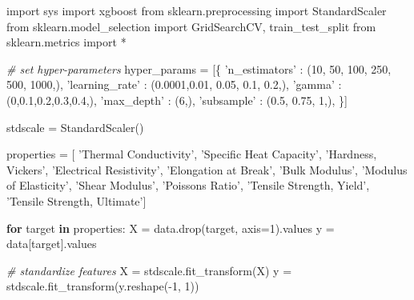 \documentclass[11pt]{article}
\newenvironment{Shaded}{}{}
\newcommand{\KeywordTok}[1]{\textcolor[rgb]{0.00,0.44,0.13}{\textbf{{#1}}}}
\newcommand{\DecValTok}[1]{\textcolor[rgb]{0.25,0.63,0.44}{{#1}}}
\newcommand{\FloatTok}[1]{\textcolor[rgb]{0.25,0.63,0.44}{{#1}}}
\newcommand{\StringTok}[1]{\textcolor[rgb]{0.25,0.44,0.63}{{#1}}}
\newcommand{\CommentTok}[1]{\textcolor[rgb]{0.38,0.63,0.69}{\textit{{#1}}}}
\newcommand{\NormalTok}[1]{{#1}}
\newcommand{\ImportTok}[1]{{#1}}
\newcommand{\ControlFlowTok}[1]{\textcolor[rgb]{0.00,0.44,0.13}{\textbf{{#1}}}}
\newcommand{\OperatorTok}[1]{\textcolor[rgb]{0.40,0.40,0.40}{{#1}}}
\begin{document}
    \begin{Shaded}
\begin{Highlighting}[]
\ImportTok{import}\NormalTok{ sys}
\ImportTok{import}\NormalTok{ xgboost}
\ImportTok{from}\NormalTok{ sklearn.preprocessing }\ImportTok{import}\NormalTok{ StandardScaler}
\ImportTok{from}\NormalTok{ sklearn.model_selection }\ImportTok{import}\NormalTok{ GridSearchCV, train_test_split}
\ImportTok{from}\NormalTok{ sklearn.metrics }\ImportTok{import} \OperatorTok{*}

\CommentTok{# set hyper-parameters}
\NormalTok{hyper_params }\OperatorTok{=}\NormalTok{ [\{}
    \StringTok{'n_estimators'}\NormalTok{ : (}\DecValTok{10}\NormalTok{, }\DecValTok{50}\NormalTok{, }\DecValTok{100}\NormalTok{, }\DecValTok{250}\NormalTok{, }\DecValTok{500}\NormalTok{, }\DecValTok{1000}\NormalTok{,),}
    \StringTok{'learning_rate'}\NormalTok{ : (}\FloatTok{0.0001}\NormalTok{,}\FloatTok{0.01}\NormalTok{, }\FloatTok{0.05}\NormalTok{, }\FloatTok{0.1}\NormalTok{, }\FloatTok{0.2}\NormalTok{,),}
    \StringTok{'gamma'}\NormalTok{ : (}\DecValTok{0}\NormalTok{,}\FloatTok{0.1}\NormalTok{,}\FloatTok{0.2}\NormalTok{,}\FloatTok{0.3}\NormalTok{,}\FloatTok{0.4}\NormalTok{,),}
    \StringTok{'max_depth'}\NormalTok{ : (}\DecValTok{6}\NormalTok{,),}
    \StringTok{'subsample'}\NormalTok{ : (}\FloatTok{0.5}\NormalTok{, }\FloatTok{0.75}\NormalTok{, }\DecValTok{1}\NormalTok{,),}
\NormalTok{\}]}

\NormalTok{stdscale }\OperatorTok{=}\NormalTok{ StandardScaler()}

\NormalTok{properties }\OperatorTok{=}\NormalTok{ [ }\StringTok{'Thermal Conductivity'}\NormalTok{, }\StringTok{'Specific Heat Capacity'}\NormalTok{, }\StringTok{'Hardness, Vickers'}\NormalTok{, }
              \StringTok{'Electrical Resistivity'}\NormalTok{, }\StringTok{'Elongation at Break'}\NormalTok{, }\StringTok{'Bulk Modulus'}\NormalTok{, }
              \StringTok{'Modulus of Elasticity'}\NormalTok{, }\StringTok{'Shear Modulus'}\NormalTok{, }\StringTok{'Poissons Ratio'}\NormalTok{, }
              \StringTok{'Tensile Strength, Yield'}\NormalTok{, }\StringTok{'Tensile Strength, Ultimate'}\NormalTok{]}

\ControlFlowTok{for}\NormalTok{ target }\KeywordTok{in}\NormalTok{ properties:}
\NormalTok{    X }\OperatorTok{=}\NormalTok{ data.drop(target, axis}\OperatorTok{=}\DecValTok{1}\NormalTok{).values}
\NormalTok{    y }\OperatorTok{=}\NormalTok{ data[target].values}
    
    \CommentTok{# standardize features}
\NormalTok{    X }\OperatorTok{=}\NormalTok{ stdscale.fit_transform(X)}
\NormalTok{    y }\OperatorTok{=}\NormalTok{ stdscale.fit_transform(y.reshape(}\OperatorTok{-}\DecValTok{1}\NormalTok{, }\DecValTok{1}\NormalTok{)) }
    

\end{Highlighting}
\end{Shaded}
\end{document}

